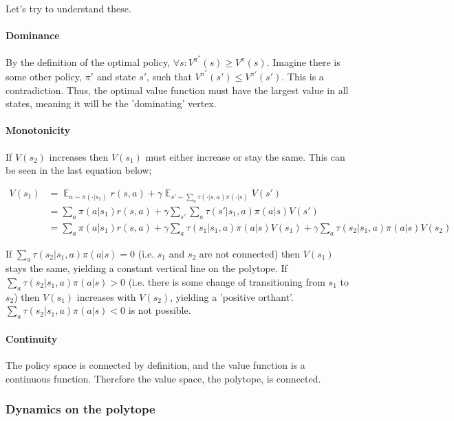 Let's try to understand these.

\paragraph{Dominance} By the definition of the optimal policy, $\forall s: V^{\pi^{*}}(s)\ge V^{\pi}(s)$.
Imagine there is some other policy, $\pi'$ and state $s'$, such that $V^{\pi^{*}}(s')\le V^{\pi'}(s')$. This is a contradiction.
Thus, the optimal value function must have the largest value in all states, meaning it will be the 'dominating' vertex.

\paragraph{Monotonicity} If $V(s_2)$ increases then $V(s_1)$ must either increase or stay the same.
This can be seen in the last equation below;

\begin{align*}
V(s_1) &= \mathop{\mathbb E}_{a \sim\pi(\cdot|s_1)} r(s, a) + \gamma \mathop{\mathbb E}_{s'\sim \sum_a \tau(\cdot|s, a)\pi(\cdot|s)} V(s')\\
&= \sum_a \pi(a|s_1)r(s, a) + \gamma \sum_{s'}\sum_a \tau(s'|s_1, a)\pi(a|s) V(s') \\
&= \sum_a \pi(a|s_1)r(s, a) + \gamma \sum_a \tau(s_1|s_1, a)\pi(a|s) V(s_1) + \gamma\sum_a \tau(s_2|s_1, a)\pi(a|s) V(s_2)
\end{align*}

If $\sum_a \tau(s_2|s_1, a)\pi(a|s) = 0$ (i.e. $s_1$ and $s_2$ are not connected)
then $V(s_1)$ stays the same, yielding a constant vertical line on the polytope.
If $\sum_a \tau(s_2|s_1, a)\pi(a|s) > 0$ (i.e. there is some change of transitioning from $s_1$ to $s_2$)
then $V(s_1)$ increases with $V(s_2)$, yielding a 'positive orthant'.
$\sum_a \tau(s_2|s_1, a)\pi(a|s) < 0$ is not possible.

\paragraph{Continuity} The policy space is connected by definition, and the value function is a continuous function.
Therefore the value space, the polytope, is connected.

\subsubsection{Dynamics on the polytope}

